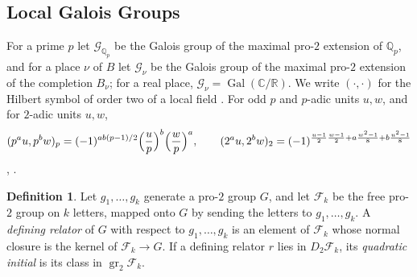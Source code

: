 \documentclass[11pt]{amsart}
\numberwithin{equation}{section}
\theoremstyle{definition}
\newtheorem{definition}[equation]{Definition}
\theoremstyle{remark}
\DeclareMathOperator{\Gal}{Gal}
\newcommand{\Q}{\mathbb Q}
\newcommand{\R}{\mathbb R}
\newcommand{\C}{\mathbb C}
\begin{document}
\subsection{Local Galois Groups}\label{tw:local-section}
For a prime $p$ let $\mathcal G_{\Q_p}$ be the Galois group of the maximal
pro-$2$ extension of $\Q_p$, and for a place $\nu$ of $B$ let $\mathcal G_\nu$
be the Galois group of the maximal pro-$2$ extension of the completion
$B_\nu$; for a real place, $\mathcal G_\nu=\Gal(\C/\R)$. We write
$(\cdot,\cdot)$ for the Hilbert symbol
of order two of a local field \cite[Chapter~III, Section~4]{MilneCFT}. For
odd $p$ and $p$-adic units $u,w$, and for $2$-adic units $u,w$,
\begin{equation}\label{tw:hilbert}
 (p^au,p^bw)_p=(-1)^{ab(p-1)/2}\Bigl(\frac up\Bigr)^b\Bigl(\frac wp\Bigr)^a,
 \qquad
 (2^au,2^bw)_2=(-1)^{\frac{u-1}2\frac{w-1}2+a\frac{w^2-1}8+b\frac{u^2-1}8}
\end{equation}
\cite[Chapter~III, Theorem~1]{SerreCourse}, \cite[Chapter~VIII,
Section~5]{MilneCFT}.

\begin{definition}\label{tw:relator}
Let $g_1,\dots,g_k$ generate a pro-$2$ group $G$, and let $\mathcal F_k$ be
the free pro-$2$ group on $k$ letters, mapped onto $G$ by sending the letters
to $g_1,\dots,g_k$. A \emph{defining relator} of $G$ with respect to
$g_1,\dots,g_k$ is an element of $\mathcal F_k$ whose normal closure is the
kernel of $\mathcal F_k\to G$. If a defining relator $r$ lies in
$D_2\mathcal F_k$, its \emph{quadratic initial} is its class in
$\operatorname{gr}_2\mathcal F_k$.
\end{definition}
\end{document}

